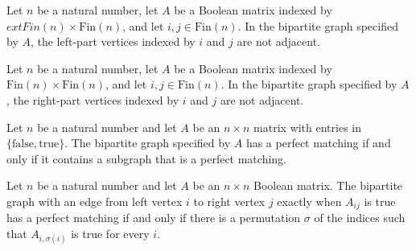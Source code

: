 \begin{theorem}
\label{Randomized.Matching.not_bipartiteGraph_adj_inl_inl}
\leanok
{}
Let $n$ be a natural number, let $A$ be a Boolean matrix indexed by
$	ext{Fin}(n)\times\text{Fin}(n)$, and let $i,j\in\text{Fin}(n)$. In the bipartite graph
specified by $A$, the left-part vertices indexed by $i$ and $j$ are not adjacent.
\end{theorem}

\begin{theorem}
\label{Randomized.Matching.not_bipartiteGraph_adj_inr_inr}
\leanok
{}
Let $n$ be a natural number, let $A$ be a Boolean matrix indexed by
$\text{Fin}(n)\times\text{Fin}(n)$, and let $i,j\in\text{Fin}(n)$. In the bipartite
graph specified by $A$, the right-part vertices indexed by $i$ and $j$ are not adjacent.
\end{theorem}

\begin{definition}
\label{Randomized.Matching.HasPerfectMatching}
\leanok
{}
Let $n$ be a natural number and let $A$ be an $n\times n$ matrix with entries in
$\{\mathrm{false},\mathrm{true}\}$. The bipartite graph specified by $A$ has a perfect
matching if and only if it contains a subgraph that is a perfect matching.
\end{definition}

\begin{theorem}
\label{Randomized.Matching.hasPerfectMatching_iff_exists_perm}
\leanok
{}
Let $n$ be a natural number and let $A$ be an $n\times n$ Boolean matrix. The bipartite
graph with an edge from left vertex $i$ to right vertex $j$ exactly when $A_{ij}$ is
true has a perfect matching if and only if there is a permutation $\sigma$ of the
indices such that $A_{i,\sigma(i)}$ is true for every $i$.
\end{theorem}

